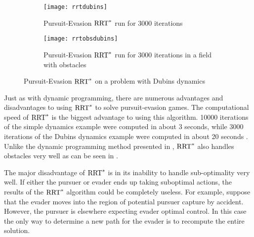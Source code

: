 \begin{figure}
\centering
\begin{subfigure}[b]{0.475\textwidth}
	\centering
	\texttt{[image: rrtdubins]}
	\caption{Pursuit-Evasion $\textnormal{RRT}^*$ run for 3000 iterations}
	\label{rrtdubins}
\end{subfigure}
\hfill
\begin{subfigure}[b]{0.475\textwidth}
	\centering
	\texttt{[image: rrtobsdubins]}
	\caption{Pursuit-Evasion $\textnormal{RRT}^*$ run for 3000 iterations in a field with obstacles}
	\label{rrtobsdubins}
\end{subfigure}
\caption{Pursuit-Evasion $\textnormal{RRT}^*$ on a problem with Dubins dynamics \cite{karaman}}
\label{rrtdubinsfig}
\end{figure}

Just as with dynamic programming, there are numerous advantages and disadvantages to using $\textnormal{RRT}^*$ to solve pursuit-evasion games. The computational speed of $\textnormal{RRT}^*$ is the biggest advantage to using this algorithm. 10000 iterations of the simple dynamics example were computed in about 3 seconds, while 3000 iterations of the Dubins dynamics example were computed in about 20 seconds \cite{karaman}. Unlike the dynamic programming method presented in , $\textnormal{RRT}^*$ also handles obstacles very well as can be seen in . 

The major disadvantage of $\textnormal{RRT}^*$ is in its inability to handle sub-optimality very well. If either the pursuer or evader ends up taking suboptimal actions, the results of the $\textnormal{RRT}^*$ algorithm could be completely useless. For example, suppose that the evader moves into the region of potential pursuer capture by accident. However, the pursuer is elsewhere expecting evader optimal control. In this case the only way to determine a new path for the evader is to recompute the entire solution.             